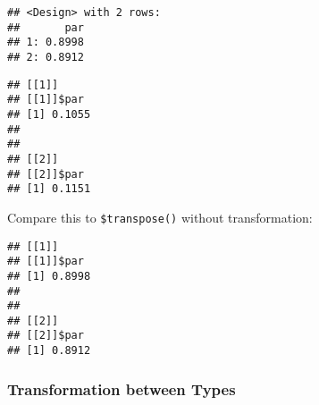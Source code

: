 \documentclass[
]{scrbook}
\newenvironment{Shaded}{\begin{snugshade}}{\end{snugshade}}
\newcommand{\AttributeTok}[1]{\textcolor[rgb]{0.77,0.63,0.00}{#1}}
\newcommand{\CommentTok}[1]{\textcolor[rgb]{0.56,0.35,0.01}{\textit{#1}}}
\newcommand{\ConstantTok}[1]{\textcolor[rgb]{0.00,0.00,0.00}{#1}}
\newcommand{\ControlFlowTok}[1]{\textcolor[rgb]{0.13,0.29,0.53}{\textbf{#1}}}
\newcommand{\DecValTok}[1]{\textcolor[rgb]{0.00,0.00,0.81}{#1}}
\newcommand{\FunctionTok}[1]{\textcolor[rgb]{0.00,0.00,0.00}{#1}}
\newcommand{\NormalTok}[1]{#1}
\newcommand{\OtherTok}[1]{\textcolor[rgb]{0.56,0.35,0.01}{#1}}
\newcommand{\SpecialCharTok}[1]{\textcolor[rgb]{0.00,0.00,0.00}{#1}}
\newcommand{\StringTok}[1]{\textcolor[rgb]{0.31,0.60,0.02}{#1}}
\renewenvironment{Shaded} {\begin{snugshade}\small} {\end{snugshade}}
\begin{document}
\begin{Shaded}
\end{Shaded}

\begin{verbatim}
## <Design> with 2 rows:
##       par
## 1: 0.8998
## 2: 0.8912
\end{verbatim}

\begin{Shaded}
\end{Shaded}

\begin{verbatim}
## [[1]]
## [[1]]$par
## [1] 0.1055
## 
## 
## [[2]]
## [[2]]$par
## [1] 0.1151
\end{verbatim}

Compare this to \texttt{\$transpose()} without transformation:

\begin{Shaded}
\end{Shaded}

\begin{verbatim}
## [[1]]
## [[1]]$par
## [1] 0.8998
## 
## 
## [[2]]
## [[2]]$par
## [1] 0.8912
\end{verbatim}

\hypertarget{transformation-between-types}{%
\subsubsection{Transformation between Types}\label{transformation-between-types}}
\end{document}

